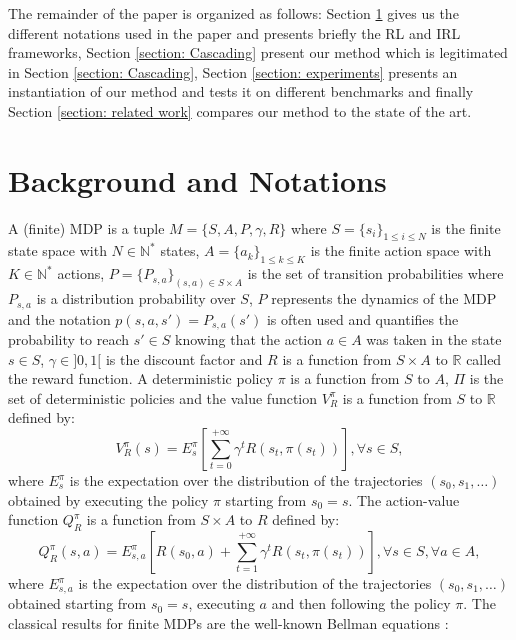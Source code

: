 \documentclass{article} %
\newcommand{\0}{\mathbf{0}}
\newcommand{\1}{\mathbf{1}}
\begin{document}
The remainder of the paper is organized as follows: Section \ref{section: background} gives us the different notations used in the paper and presents briefly the RL and IRL frameworks, Section \ref{section: Cascading} present our method which is legitimated in Section \ref{section: Cascading}, Section \ref{section: experiments} presents an instantiation of our method and tests it on different benchmarks and finally Section \ref{section: related work} compares our method to the state of the art.

\section{Background and Notations}
\label{section: background}
A (finite) MDP \cite{puterman1994markov} is a tuple $M=\{S,A,P,\gamma,R\}$ where $S=\{s_i\}_{1\leq i \leq N}$ is the finite state space with $N\in\mathbb{N}^*$ states, $A=\{a_k\}_{1\leq k \leq K}$ is the finite action space with $K\in\mathbb{N}^*$ actions, $P=\{P_{s,a}\}_{(s,a)\in S\times A}$ is the set of transition probabilities where $P_{s,a}$ is a distribution probability over $S$, $P$ represents the dynamics of the MDP and the notation $p(s,a,s')=P_{s,a}(s')$ is often used and quantifies the probability to reach $s'\in S$ knowing that the action $a \in A$ was taken in the state $s\in S$, $\gamma\in]0,1[$ is the discount factor and $R$ is a function from $S\times A$ to $\mathbb{R}$ called the reward function. A deterministic policy $\pi$ is a function from $S$ to $A$, $\Pi$ is the set of deterministic policies and the value function $V^\pi_R$ is a function from $S$ to $\mathbb{R}$ defined by:
\begin{equation}
V^\pi_R(s)=E^\pi_s[\sum_{t=0}^{+\infty}\gamma^tR(s_t,\pi(s_t))], \forall s \in S,
\end{equation}
where $E^\pi_s$ is the expectation over the distribution of the trajectories $(s_0,s_1,\dots)$ obtained by executing the policy $\pi$ starting from $s_0=s$.
The action-value function $Q^\pi_R$ is a function from $S\times A$ to $R$ defined by:
\begin{equation}
Q^\pi_R(s,a)=E^\pi_{s,a}[R(s_0,a)+\sum_{t=1}^{+\infty}\gamma^tR(s_t,\pi(s_t))], \forall s \in S,\forall a \in A,
\end{equation}
where $E^\pi_{s,a}$ is the expectation over the distribution of the trajectories $(s_0,s_1,\dots)$ obtained starting from $s_0=s$, executing $a$ and then following the policy $\pi$.
The classical results for finite MDPs are the well-known Bellman equations \cite{sutton1998reinforcement}:
\end{document}
